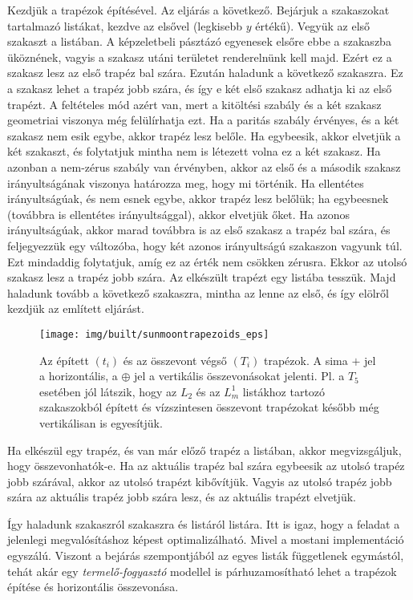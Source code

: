 \documentclass[12pt]{report}
\theoremstyle{definition}
\begin{document}
Kezdjük a trapézok építésével. Az eljárás a következő. Bejárjuk a szakaszokat
tartalmazó listákat, kezdve az elsővel (legkisebb $y$ értékű). Vegyük az első
szakaszt a listában. A képzeletbeli pásztázó egyenesek elsőre ebbe a szakaszba
üköznének, vagyis a szakasz utáni területet renderelnünk kell majd. Ezért ez a
szakasz lesz az első trapéz bal szára. Ezután haladunk a következő szakaszra.
Ez a szakasz lehet a trapéz jobb szára, és így e két első szakasz adhatja ki az
első trapézt. A feltételes mód azért van, mert a kitöltési szabály és a két
szakasz geometriai viszonya még felülírhatja ezt. Ha a paritás szabály
érvényes, és a két szakasz nem esik egybe, akkor trapéz lesz belőle. Ha
egybeesik, akkor elvetjük a két szakaszt, és folytatjuk mintha nem is létezett
volna ez a két szakasz. Ha azonban a nem-zérus szabály van érvényben, akkor az
első és a második szakasz irányultságának viszonya határozza meg, hogy mi
történik. Ha ellentétes irányultságúak, és nem esnek egybe, akkor trapéz lesz
belőlük; ha egybeesnek (továbbra is ellentétes irányultsággal), akkor elvetjük
őket. Ha azonos irányultságúak, akkor marad továbbra is az első szakasz a
trapéz bal szára, és feljegyezzük egy változóba, hogy két azonos irányultságú
szakaszon vagyunk túl. Ezt mindaddig folytatjuk, amíg ez az érték nem csökken
zérusra. Ekkor az utolsó szakasz lesz a trapéz jobb szára. Az elkészült trapézt
egy listába tesszük. Majd haladunk tovább a következő szakaszra, mintha az
lenne az első, és így elölről kezdjük az említett eljárást.

  \begin{figure}
    \centering \texttt{[image: img/built/sunmoontrapezoids\_eps]}
    \caption{\label{sunmoontrapezoids} Az épített $(t_i)$ és az összevont végső
    $(T_i)$ trapézok. A sima $+$ jel a horizontális, a $\oplus$ jel a
    vertikális összevonásokat jelenti. Pl. a $T_5$ esetében jól látszik, hogy
    az $L_2$ és az $L_m^1$ listákhoz tartozó szakaszokból épített és
    vízszintesen összevont trapézokat később még vertikálisan is egyesítjük.}
  \end{figure}

Ha elkészül egy trapéz, és van már előző trapéz a listában, akkor
megvizsgáljuk, hogy összevonhatók-e. Ha az aktuális trapéz bal szára egybeesik
az utolsó trapéz jobb szárával, akkor az utolsó trapézt kibővítjük. Vagyis az
utolsó trapéz jobb szára az aktuális trapéz jobb szára lesz, és az aktuális
trapézt elvetjük.

Így haladunk szakaszról szakaszra és listáról listára. Itt is igaz, hogy a
feladat a jelenlegi megvalósításhoz képest optimalizálható. Mivel a mostani
implementáció egyszálú. Viszont a bejárás szempontjából az egyes listák
függetlenek egymástól, tehát akár egy \emph{termelő-fogyasztó} modellel is
párhuzamosítható lehet a trapézok építése és horizontális összevonása.
\end{document}
